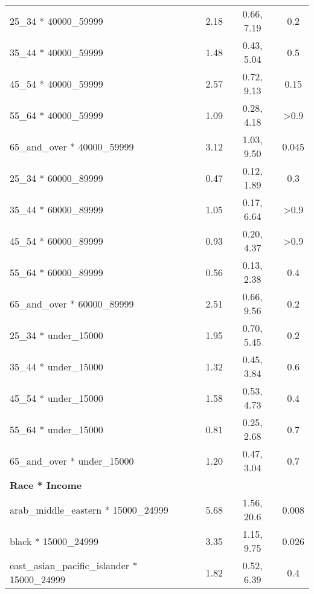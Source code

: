 \documentclass[
  letterpaper,
  DIV=11,
  numbers=noendperiod]{scrartcl}
\begin{document}
\begin{longtable}{lccc}
\hspace{1em}25\_34 * 40000\_59999 & 2.18 & 0.66, 7.19 & 0.2\\
\hspace{1em}35\_44 * 40000\_59999 & 1.48 & 0.43, 5.04 & 0.5\\
\hspace{1em}45\_54 * 40000\_59999 & 2.57 & 0.72, 9.13 & 0.15\\
\hspace{1em}55\_64 * 40000\_59999 & 1.09 & 0.28, 4.18 & >0.9\\
\addlinespace
\hspace{1em}65\_and\_over * 40000\_59999 & 3.12 & 1.03, 9.50 & 0.045\\
\hspace{1em}25\_34 * 60000\_89999 & 0.47 & 0.12, 1.89 & 0.3\\
\hspace{1em}35\_44 * 60000\_89999 & 1.05 & 0.17, 6.64 & >0.9\\
\hspace{1em}45\_54 * 60000\_89999 & 0.93 & 0.20, 4.37 & >0.9\\
\hspace{1em}55\_64 * 60000\_89999 & 0.56 & 0.13, 2.38 & 0.4\\
\addlinespace
\hspace{1em}65\_and\_over * 60000\_89999 & 2.51 & 0.66, 9.56 & 0.2\\
\hspace{1em}25\_34 * under\_15000 & 1.95 & 0.70, 5.45 & 0.2\\
\hspace{1em}35\_44 * under\_15000 & 1.32 & 0.45, 3.84 & 0.6\\
\hspace{1em}45\_54 * under\_15000 & 1.58 & 0.53, 4.73 & 0.4\\
\hspace{1em}55\_64 * under\_15000 & 0.81 & 0.25, 2.68 & 0.7\\
\addlinespace
\hspace{1em}65\_and\_over * under\_15000 & 1.20 & 0.47, 3.04 & 0.7\\
\textbf{Race * Income} &  &  & \\
\hspace{1em}arab\_middle\_eastern * 15000\_24999 & 5.68 & 1.56, 20.6 & 0.008\\
\hspace{1em}black * 15000\_24999 & 3.35 & 1.15, 9.75 & 0.026\\
\hspace{1em}east\_asian\_pacific\_islander * 15000\_24999 & 1.82 & 0.52, 6.39 & 0.4\\

\end{longtable}
\end{document}
